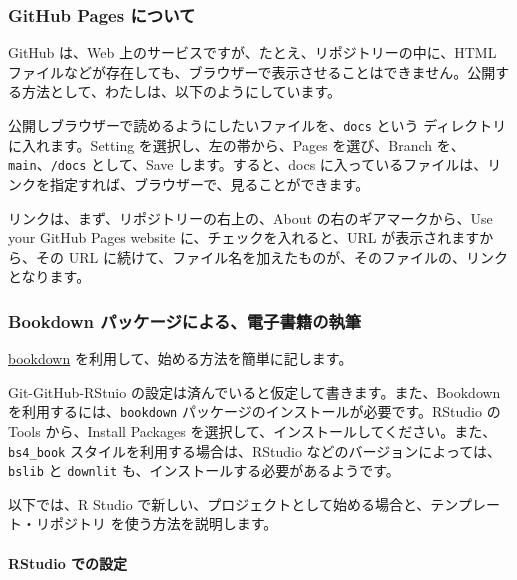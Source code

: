 \documentclass[
]{bxjsbook}
\theoremstyle{definition}
\theoremstyle{definition}
\theoremstyle{definition}
\theoremstyle{definition}
\theoremstyle{remark}
\begin{document}
\hypertarget{github-pages-ux306bux3064ux3044ux3066}{%
\subsubsection{GitHub Pages について}\label{github-pages-ux306bux3064ux3044ux3066}}

GitHub は、Web 上のサービスですが、たとえ、リポジトリーの中に、HTML ファイルなどが存在しても、ブラウザーで表示させることはできません。公開する方法として、わたしは、以下のようにしています。

公開しブラウザーで読めるようにしたいファイルを、\texttt{docs} という ディレクトリに入れます。Setting を選択し、左の帯から、Pages を選び、Branch を、\texttt{main}、\texttt{/docs} として、Save します。すると、docs に入っているファイルは、リンクを指定すれば、ブラウザーで、見ることができます。

リンクは、まず、リポジトリーの右上の、About の右のギアマークから、Use your GitHub Pages website に、チェックを入れると、URL が表示されますから、その URL に続けて、ファイル名を加えたものが、そのファイルの、リンクとなります。

\hypertarget{bookdown-ux30d1ux30c3ux30b1ux30fcux30b8ux306bux3088ux308bux96fbux5b50ux66f8ux7c4dux306eux57f7ux7b46}{%
\subsubsection{Bookdown パッケージによる、電子書籍の執筆}\label{bookdown-ux30d1ux30c3ux30b1ux30fcux30b8ux306bux3088ux308bux96fbux5b50ux66f8ux7c4dux306eux57f7ux7b46}}

\href{https://github.com/rstudio/bookdown}{bookdown} を利用して、始める方法を簡単に記します。

Git-GitHub-RStuio の設定は済んでいると仮定して書きます。また、Bookdown を利用するには、\texttt{bookdown} パッケージのインストールが必要です。RStudio の Tools から、Install Packages を選択して、インストールしてください。また、\texttt{bs4\_book} スタイルを利用する場合は、RStudio などのバージョンによっては、\texttt{bslib} と \texttt{downlit} も、インストールする必要があるようです。

以下では、R Studio で新しい、プロジェクトとして始める場合と、テンプレート・リポジトリ を使う方法を説明します。

\hypertarget{rstudio-ux3067ux306eux8a2dux5b9a}{%
\paragraph{RStudio での設定}\label{rstudio-ux3067ux306eux8a2dux5b9a}}
\end{document}
